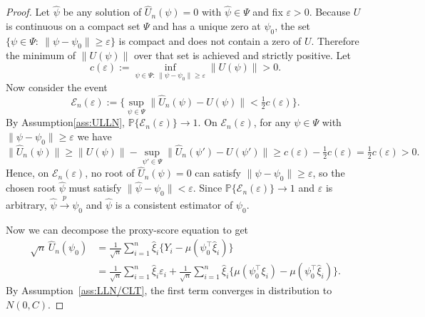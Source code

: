 \documentclass[11pt]{article}
\theoremstyle{definition}
\theoremstyle{remark}
\newcommand{\Pp}{\mathbb{P}}
\newcommand{\toP}{\xrightarrow{\,p\,}}
\begin{document}
\begin{proof}
Let $\hat\psi$ be any solution of $\hat U_n(\psi)=0$ with $\hat\psi\in\Psi$ and fix $\varepsilon>0$.
Because $U$ is continuous on a compact set $\Psi$ and has a unique zero at $\psi_0$, the set
$\{\psi\in\Psi:\ \|\psi-\psi_0\|\ge\varepsilon\}$ is compact and does not contain a zero of $U$. Therefore the minimum of $\|U(\psi)\|$ over that set is achieved and strictly positive. Let
\begin{equation}
c(\varepsilon):=\inf_{\psi\in\Psi:\ \|\psi-\psi_0\|\ge\varepsilon}\|U(\psi)\|>0.
\label{eq:sep}
\end{equation}
Now consider the event
\[
\mathcal E_n(\varepsilon):=\Big\{\sup_{\psi\in\Psi}\|\hat U_n(\psi)-U(\psi)\|<\tfrac12 c(\varepsilon)\Big\}.
\]
By Assumption\ref{ass:ULLN}, $\Pp\{\mathcal E_n(\varepsilon)\}\to 1$.
On $\mathcal E_n(\varepsilon)$, for any $\psi\in\Psi$ with $\|\psi-\psi_0\|\ge\varepsilon$ we have
\[
\|\hat U_n(\psi)\|\ge \|U(\psi)\|-\sup_{\psi'\in\Psi}\|\hat U_n(\psi')-U(\psi')\|
\ge c(\varepsilon)-\tfrac12 c(\varepsilon)=\tfrac12 c(\varepsilon)>0.
\]
Hence, on $\mathcal E_n(\varepsilon)$, no root of $\hat U_n(\psi)=0$ can satisfy
$\|\psi-\psi_0\|\ge\varepsilon$, so the chosen root $\hat\psi$ must satisfy $\|\hat\psi-\psi_0\|<\varepsilon$.
Since $\Pp\{\mathcal E_n(\varepsilon)\}\to 1$ and $\varepsilon$ is arbitrary, $\hat\psi\toP\psi_0$ and $\hat\psi$ is a consistent estimator of $\psi_0.$

Now we can decompose the proxy-score equation to get
\begin{align}
\sqrt{n}\,\hat U_n(\psi_0)
&=\frac{1}{\sqrt{n}}\sum_{i=1}^n \hat\xi_i\big\{Y_i-\mu(\psi_0^\top\hat\xi_i)\big\}\nonumber\\
&=\frac{1}{\sqrt{n}}\sum_{i=1}^n \hat\xi_i\varepsilon_i
+\frac{1}{\sqrt{n}}\sum_{i=1}^n \hat\xi_i\Big\{\mu(\psi_0^\top\xi_i)-\mu(\psi_0^\top\hat\xi_i)\Big\}.
\label{eq:decomp-new}
\end{align}
By Assumption~\ref{ass:LLN/CLT}, the first term converges in distribution to $N(0,C)$.


\end{proof}
\end{document}

